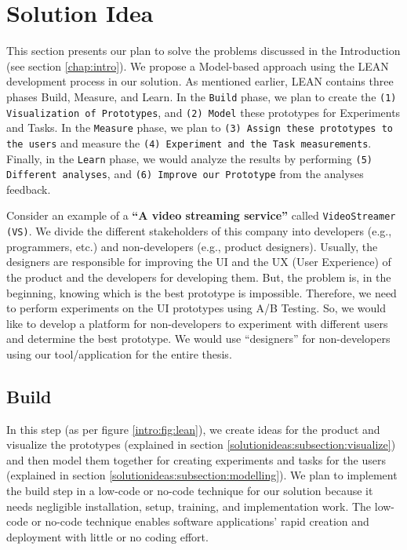 \chapter{Solution Idea} \label{chap:solutionideas}

This section presents our plan to solve the problems discussed in the Introduction (see section \ref{chap:intro}).
We propose a Model-based approach using the LEAN development process in our solution.
As mentioned earlier, LEAN contains three phases Build, Measure, and Learn.
In the \texttt{Build} phase, we plan to create the \texttt{(1) Visualization of Prototypes}, and \texttt{(2) Model} these prototypes for Experiments and Tasks.
In the \texttt{Measure} phase, we plan to \texttt{(3) Assign these prototypes to the users} and measure the \texttt{(4) Experiment and the Task measurements}.
Finally, in the \texttt{Learn} phase, we would analyze the results by performing \texttt{(5) Different analyses}, and \texttt{(6) Improve our Prototype} from the analyses feedback.  

Consider an example of a \textbf{``A video streaming service''} called \texttt{VideoStreamer (VS)}.
We divide the different stakeholders of this company into developers (e.g., programmers, etc.) and non-developers (e.g., product designers).
Usually, the designers are responsible for improving the UI and the UX (User Experience) of the product and the developers for developing them.
But, the problem is, in the beginning, knowing which is the best prototype is impossible.
Therefore, we need to perform experiments on the UI prototypes using A/B Testing.
So, we would like to develop a platform for non-developers to experiment with different users and determine the best prototype.
We would use ``designers'' for non-developers using our tool/application for the entire thesis.

\section{Build}
In this step (as per figure \ref{intro:fig:lean}), we create ideas for the product and visualize the prototypes (explained in section \ref{solutionideas:subsection:visualize}) and then model them together for creating experiments and tasks for the users (explained in section \ref{solutionideas:subsection:modelling}).
We plan to implement the build step in a low-code or no-code technique for our solution because it needs negligible installation, setup, training, and implementation work.
The low-code or no-code technique enables software applications' rapid creation and deployment with little or no coding effort.

